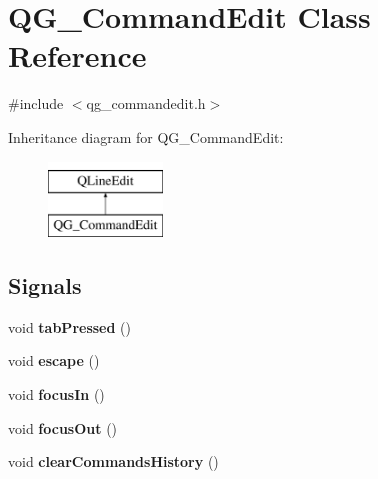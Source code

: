 \hypertarget{classQG__CommandEdit}{\section{Q\-G\-\_\-\-Command\-Edit Class Reference}
\label{classQG__CommandEdit}
}


{\ttfamily \#include $<$qg\-\_\-commandedit.\-h$>$}

Inheritance diagram for Q\-G\-\_\-\-Command\-Edit\-:\begin{figure}[H]
\begin{center}
\leavevmode
\includegraphics[height=2.000000cm]{classQG__CommandEdit}
\end{center}
\end{figure}
\subsection*{Signals}
\begin{DoxyCompactItemize}
\item 
\hypertarget{classQG__CommandEdit_adf2fb4787b9d8c24262c89d5b12d26ea}{void {\bfseries tab\-Pressed} ()}\label{classQG__CommandEdit_adf2fb4787b9d8c24262c89d5b12d26ea}

\item 
\hypertarget{classQG__CommandEdit_ad8600208f232b1191af0992725dabeda}{void {\bfseries escape} ()}\label{classQG__CommandEdit_ad8600208f232b1191af0992725dabeda}

\item 
\hypertarget{classQG__CommandEdit_a12aca8621e971e58eece5131f9840b83}{void {\bfseries focus\-In} ()}\label{classQG__CommandEdit_a12aca8621e971e58eece5131f9840b83}

\item 
\hypertarget{classQG__CommandEdit_a86f603e8641e27785db0ad81ca7588ec}{void {\bfseries focus\-Out} ()}\label{classQG__CommandEdit_a86f603e8641e27785db0ad81ca7588ec}

\item 
\hypertarget{classQG__CommandEdit_a88009b4756579a604efabcd6ab4695f3}{void {\bfseries clear\-Commands\-History} ()}\label{classQG__CommandEdit_a88009b4756579a604efabcd6ab4695f3}

\end{DoxyCompactItemize}
